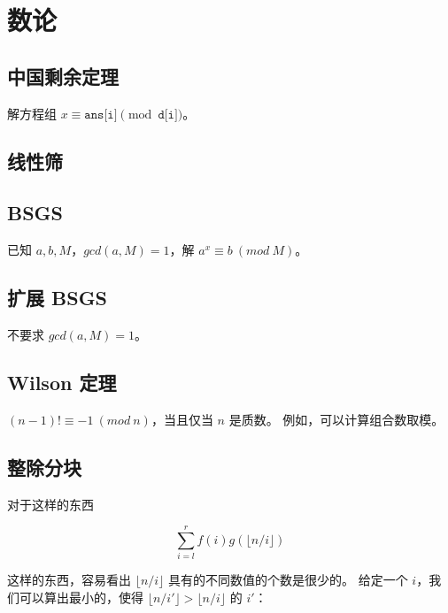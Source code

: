 \section{数论}

\subsection{中国剩余定理}

解方程组 $x \equiv \texttt{ans[i]} \pmod {\texttt{d[i]}}$。



\subsection{线性筛}



\subsection{BSGS}

已知 $a, b, M$，$gcd(a, M) = 1$，解 $a^x \equiv b \ (mod \ M)$。



\subsection{扩展 BSGS}

不要求 $gcd(a, M) = 1$。



\subsection{Wilson 定理}

$(n-1)! \equiv -1 \ (mod \ n)$，当且仅当 $n$ 是质数。
例如，可以计算组合数取模。



\subsection{整除分块}

对于这样的东西

$$\sum_{i=l}^r f(i) g(\lfloor n/i \rfloor)$$

这样的东西，容易看出 $\lfloor n/i \rfloor$ 具有的不同数值的个数是很少的。
给定一个 $i$，我们可以算出最小的，使得 $\lfloor n/i' \rfloor >
\lfloor n/i \rfloor$ 的 $i'$：

